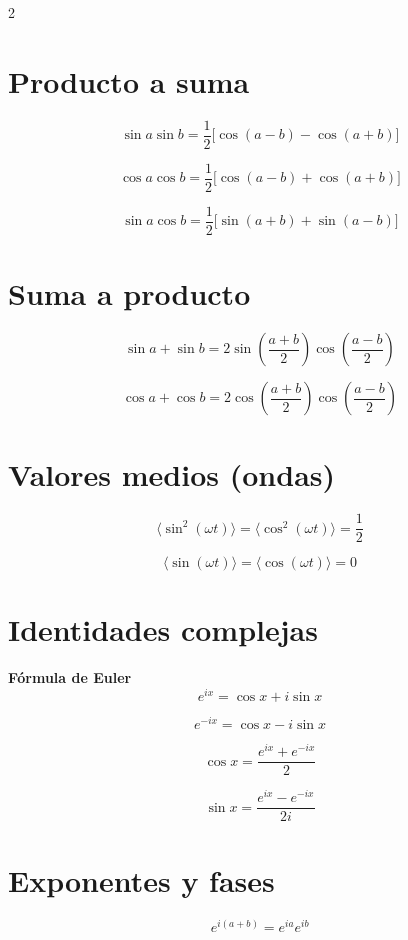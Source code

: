 \documentclass[10pt,a4paper]{article}
\begin{document}
\begin{multicols}{2}
\section*{Producto a suma}

\[
\sin a\sin b=\frac{1}{2}\Big[\cos(a-b)-\cos(a+b)\Big]
\]

\[
\cos a\cos b=\frac{1}{2}\Big[\cos(a-b)+\cos(a+b)\Big]
\]

\[
\sin a\cos b=\frac{1}{2}\Big[\sin(a+b)+\sin(a-b)\Big]
\]

\section*{Suma a producto}

\[
\sin a+\sin b=
2\sin\!\left(\frac{a+b}{2}\right)
\cos\!\left(\frac{a-b}{2}\right)
\]

\[
\cos a+\cos b=
2\cos\!\left(\frac{a+b}{2}\right)
\cos\!\left(\frac{a-b}{2}\right)
\]

\section*{Valores medios (ondas)}

\[
\langle \sin^2(\omega t)\rangle =
\langle \cos^2(\omega t)\rangle = \frac{1}{2}
\]

\[
\langle \sin(\omega t)\rangle =
\langle \cos(\omega t)\rangle = 0
\]

\section*{Identidades complejas}

\textbf{Fórmula de Euler}
\[
e^{ix}=\cos x+i\sin x
\]

\[
e^{-ix}=\cos x-i\sin x
\]

\[
\cos x=\frac{e^{ix}+e^{-ix}}{2}
\]

\[
\sin x=\frac{e^{ix}-e^{-ix}}{2i}
\]

\section*{Exponentes y fases}

\[
e^{i(a+b)}=e^{ia}e^{ib}
\]


\end{multicols}
\end{document}
